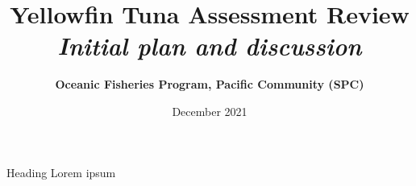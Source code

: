 \documentclass[aspectratio=169]{beamer}
\begin{document}
\begin{frame}
  \title{Yellowfin Tuna Assessment Review\\
  {\large\it Initial plan and discussion}}
  \author{\darkblue\bfseries Oceanic Fisheries Program, Pacific Community (SPC)}
  \date{ December 2021}
  \titlepage
\end{frame}

\begin{frame}{Heading}
  Lorem ipsum
\end{frame}
\end{document}
